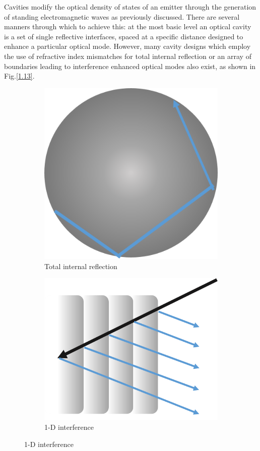 Cavities modify the optical density of states of an emitter through the generation of standing electromagnetic waves as previously discussed. There are several manners through which to achieve this: at the most basic level an optical cavity is a set of single reflective interfaces, spaced at a specific distance designed to enhance a particular optical mode. However, many cavity designs which employ the use of refractive index mismatches for total internal reflection or an array of boundaries leading to interference enhanced optical modes also exist, as shown in Fig.\ref{1.13}.
\begin{figure}
	\begin{subfigure}[b]{0.3\textwidth}
		\centering
		\includegraphics[width=.75\linewidth]{Figs/Ch1/mdisk}
		\caption{Total internal reflection}
		
	\end{subfigure}%
	\hspace*{0.5cm}
	\begin{subfigure}[b]{0.3\textwidth}
		\centering
		\includegraphics[width=.85\linewidth]{Figs/Ch1/dbr}
		\caption{1-D interference}
		

\end{subfigure}
\end{figure}
